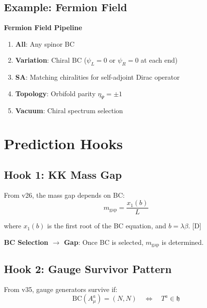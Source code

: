 \documentclass[11pt,a4paper]{article}
\newcommand{\tagD}{\textcolor{blue!70!black}{[D]}}
\begin{document}
\subsection{Example: Fermion Field}

\begin{pipelinebox}
\textbf{Fermion Field Pipeline}
\begin{enumerate}
    \item \textbf{All}: Any spinor BC
    \item \textbf{Variation}: Chiral BC ($\psi_L = 0$ or $\psi_R = 0$ at each end)
    \item \textbf{SA}: Matching chiralities for self-adjoint Dirac operator
    \item \textbf{Topology}: Orbifold parity $\eta_\Psi = \pm 1$
    \item \textbf{Vacuum}: Chiral spectrum selection
\end{enumerate}
\end{pipelinebox}

\section{Prediction Hooks}

\subsection{Hook 1: KK Mass Gap}

From v26, the mass gap depends on BC:
\begin{equation}
\label{eq:hook-gap}
m_{\text{gap}} = \frac{x_1(b)}{L}
\end{equation}

where $x_1(b)$ is the first root of the BC equation, and $b = \lambda\beta$. \tagD

\textbf{BC Selection $\to$ Gap}: Once BC is selected, $m_{\text{gap}}$ is determined.

\subsection{Hook 2: Gauge Survivor Pattern}

From v35, gauge generators survive if:
\begin{equation}
\label{eq:hook-survivor}
\text{BC}(A_\mu^a) = (N, N) \quad \Leftrightarrow \quad T^a \in \mathfrak{h}
\end{equation}
\end{document}

